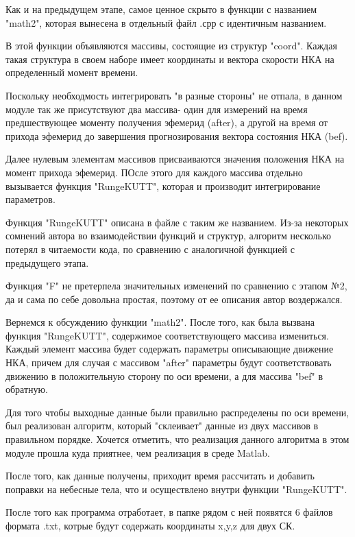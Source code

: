 \documentclass[]{article}
\begin{document}
Как и на предыдущем этапе, самое ценное скрыто в функции с названием "math2", которая вынесена в отдельный файл .срр с идентичным названием. 

В этой функции объявляются массивы, состоящие из структур "coord". Каждая такая структура в своем наборе имеет координаты и вектора скорости НКА на определенный момент времени.

Поскольку необходмость интегрировать "в разные стороны" не отпала, в данном модуле так же присутствуют два массива- один для измерений на время предшествующее моменту получения эфемерид (after), а другой на время от прихода эфемерид до завершения прогнозирования вектора состояния НКА (bef).

Далее нулевым элементам массивов присваиваются значения положения НКА на момент прихода эфемерид. ПОсле этого для каждого массива отдельно вызывается функция "RungeKUTT", которая и производит интегрирование параметров.

Функция "RungeKUTT" описана в файле с таким же названием. 
Из-за некоторых сомнений автора во взаимодействии функций и структур, алгоритм несколько потерял в читаемости кода, по сравнению с аналогичной функцией с предыдущего этапа.

Функция "F" не претерпела значительных изменений по сравнению с этапом №2, да и сама по себе довольна простая, поэтому от ее описания автор воздержался.

Вернемся к обсуждению функции "math2". После того, как была вызвана функция "RungeKUTT", содержимое соответствующего массива измениться. Каждый элемент массива будет содержать параметры описывающие движение НКА, причем для случая с массивом "after" параметры будут соответствовать движению в положительную сторону по оси времени, а для массива "bef" в обратную.

Для того чтобы выходные данные были правильно распределены по оси времени, был реализован алгоритм, который "склеивает" данные из двух массивов в правильном порядке. Хочется отметить, что реализация данного алгоритма в этом модуле прошла куда приятнее, чем реализация в среде Matlab.

После того, как данные получены, приходит время рассчитать и добавить поправки на небесные тела, что и осуществлено внутри функции "RungeKUTT".

После того как программа отработает, в папке рядом с ней появятся 6 файлов формата .txt, котрые будут содержать координаты x,y,z для двух СК.
\end{document}
